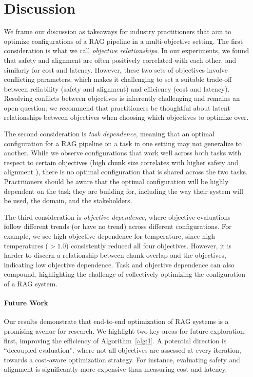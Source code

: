 \section{Discussion}
\label{sec:discussion}
We frame our discussion as takeaways for industry practitioners that aim to optimize configurations of a RAG pipeline in a multi-objective setting. The first consideration
is what we call \emph{objective relationships}. In our experiments, we found that safety and alignment are often positively correlated with each other, and similarly for cost and latency. However, these two sets of objectives involve conflicting parameters, which makes it challenging to set a suitable trade-off between reliability (safety and alignment) and efficiency (cost and latency). Resolving conflicts between objectives is inherently challenging and remains an open question; we recommend that practitioners be thoughtful about latent relationships between objectives when choosing which objectives to optimize over. %

The second consideration is \emph{task dependence}, meaning that an optimal configuration for a RAG pipeline on a task in one setting may not generalize to another. While we observe configurations that work well across both tasks with respect to certain objectives (\eg high chunk size correlates with higher safety and alignment%
), there is no optimal configuration that is shared across the two tasks. Practitioners should be aware that the optimal configuration will be highly dependent on the task they are building for, including the way their system will be used, the domain, and the stakeholders. 

The third consideration is \emph{objective dependence}, where objective evaluations follow different trends (or have no trend) across different configurations. For example, we see high objective dependence for temperature, since high temperatures (\eg $>1.0$) consistently reduced all four objectives. However, it is harder to discern a relationship between chunk overlap and the objectives, indicating low objective dependence. Task and objective dependence can also compound, highlighting the challenge of collectively optimizing the configuration of a RAG system.

\paragraph{Future Work} Our results demonstrate that end-to-end optimization of RAG systems is a promising avenue for research. We highlight two key areas for future exploration: first, improving the efficiency of Algorithm~\ref{alg:1}. A potential direction is ``decoupled evaluation'', where not all objectives are assessed at every iteration, towards a cost-aware optimization strategy. For instance, evaluating safety and alignment is significantly more expensive than measuring cost and latency.

